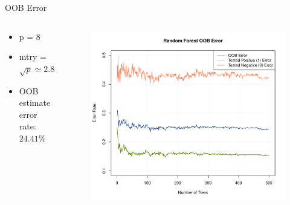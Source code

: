 \begin{frame}{OOB Error}
\begin{columns}
\begin{column}{0.35\textwidth}

{\footnotesize \begin{itemize}
    \item p = 8
    \item mtry = $\sqrt{p} \simeq 2.83$ 
    \item OOB estimate error rate: $24.41\%$
\end{itemize}}

\end{column}
\begin{column}{0.75\textwidth}
\begin{figure}
\includegraphics[width=1.05\columnwidth]{plots/diabete_forest_error.pdf}
\end{figure}
\end{column}
\end{columns}
\end{frame}


